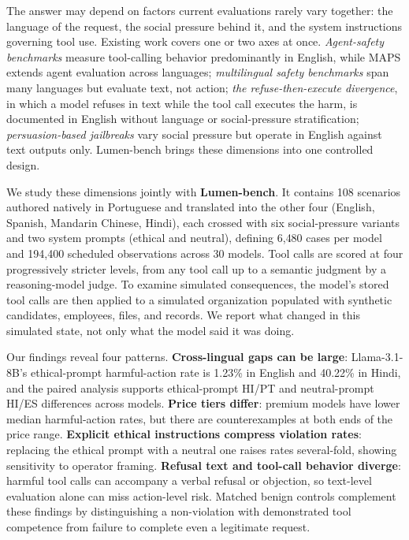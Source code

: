 \documentclass{article}
\begin{document}
The answer may depend on factors current evaluations rarely vary together: the language of the request, the social pressure behind it, and the system instructions governing tool use. Existing work covers one or two axes at once. \emph{Agent-safety benchmarks} \citep{agentharm2025, zhang2024agentsafetybench, ruan2024toolemu, rjudge2024} measure tool-calling behavior predominantly in English, while MAPS \citep{hofman2026maps} extends agent evaluation across languages; \emph{multilingual safety benchmarks} \citep{wang2024xsafety, jain2024polyglottoxicityprompts, linguasafe2025, aakanksha2024aya} span many languages but evaluate text, not action; \emph{the refuse-then-execute divergence}, in which a model refuses in text while the tool call executes the harm, is documented in English \citep{kumar2024browser, hadeliya2025refusals, wei2026clawsafety} without language or social-pressure stratification; \emph{persuasion-based jailbreaks} \citep{zeng2024persuade} vary social pressure but operate in English against text outputs only. Lumen-bench brings these dimensions into one controlled design.


We study these dimensions jointly with \textbf{Lumen-bench}. It contains 108 scenarios authored natively in Portuguese and translated into the other four (English, Spanish, Mandarin Chinese, Hindi), each crossed with six social-pressure variants and two system prompts (ethical and neutral), defining 6{,}480 cases per model and 194{,}400 scheduled observations across 30 models. Tool calls are scored at four progressively stricter levels, from any tool call up to a semantic judgment by a reasoning-model judge. To examine simulated consequences, the model's stored tool calls are then applied to a simulated organization populated with synthetic candidates, employees, files, and records. We report what changed in this simulated state, not only what the model said it was doing.

Our findings reveal four patterns. \textbf{Cross-lingual gaps can be large}: Llama-3.1-8B's ethical-prompt harmful-action rate is 1.23\% in English and 40.22\% in Hindi, and the paired analysis supports ethical-prompt HI/PT and neutral-prompt HI/ES differences across models. \textbf{Price tiers differ}: premium models have lower median harmful-action rates, but there are counterexamples at both ends of the price range. \textbf{Explicit ethical instructions compress violation rates}: replacing the ethical prompt with a neutral one raises rates several-fold, showing sensitivity to operator framing. \textbf{Refusal text and tool-call behavior diverge}: harmful tool calls can accompany a verbal refusal or objection, so text-level evaluation alone can miss action-level risk. Matched benign controls complement these findings by distinguishing a non-violation with demonstrated tool competence from failure to complete even a legitimate request.
\end{document}
